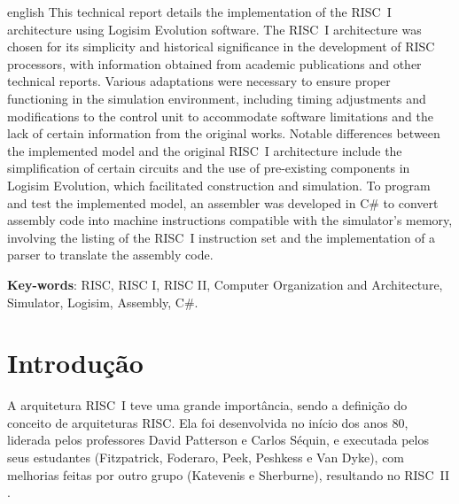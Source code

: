 \documentclass[
	article,			%
	11pt,				%
	oneside,			%
	a4paper,			%
	english,			%
	brazil,				%
	sumario=tradicional
	]{abntex2}
\begin{document}
\renewcommand{\resumoname}{Abstract}
\begin{resumoumacoluna}
 \begin{otherlanguage*}{english}
  This technical report details the implementation of the RISC~I architecture using Logisim Evolution software. The RISC~I architecture was chosen for its simplicity and historical significance in the development of RISC processors, with information obtained from academic publications and other technical reports. Various adaptations were necessary to ensure proper functioning in the simulation environment, including timing adjustments and modifications to the control unit to accommodate software limitations and the lack of certain information from the original works. Notable differences between the implemented model and the original RISC~I architecture include the simplification of certain circuits and the use of pre-existing components in Logisim Evolution, which facilitated construction and simulation. To program and test the implemented model, an assembler was developed in C\# to convert assembly code into machine instructions compatible with the simulator's memory, involving the listing of the RISC~I instruction set and the implementation of a parser to translate the assembly code.
   \vspace{\onelineskip}
 
   \noindent
   \textbf{Key-words}: RISC, RISC I, RISC II, Computer Organization and Architecture, Simulator, Logisim, Assembly, C\#.
 \end{otherlanguage*}  
\end{resumoumacoluna}

\textual

\newpage
\section{Introdução}

A arquitetura RISC~I teve uma grande importância, sendo a definição do conceito de arquiteturas RISC. Ela foi desenvolvida no início dos anos 80, liderada pelos professores David Patterson e Carlos Séquin, e executada pelos seus estudantes (Fitzpatrick, Foderaro, Peek, Peshkess e Van Dyke), com melhorias feitas por outro grupo (Katevenis e Sherburne), resultando no RISC~II \cite{daniel_t_fitzpatrick_riscy_1982}.
\end{document}
